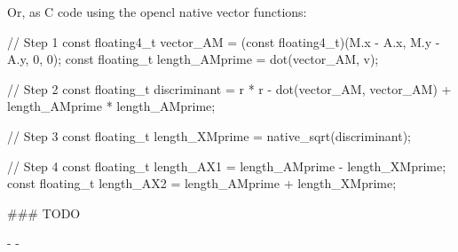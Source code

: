 Or, as C code using the opencl native vector functions:

\begin{ccode}
  // Step 1
  const floating4_t vector_AM = (const floating4_t)(M.x - A.x, M.y - A.y, 0, 0);
  const floating_t length_AMprime = dot(vector_AM, v);

  // Step 2
  const floating_t discriminant = r * r - dot(vector_AM, vector_AM) + length_AMprime * length_AMprime;

  // Step 3
  const floating_t length_XMprime = native_sqrt(discriminant);

  // Step 4
  const floating_t length_AX1 = length_AMprime - length_XMprime;
  const floating_t length_AX2 = length_AMprime + length_XMprime;
\end{ccode}


### TODO

- 
- 

